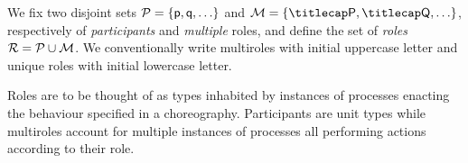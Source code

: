 %

We fix two disjoint sets $\participants = \{\ptp p, \ptp q, \ldots\}$
and $\multiroles = \{\amulti P, \amulti Q, \ldots \}$, respectively of
\emph{participants} and \emph{multiple} roles, and define the set of
\emph{roles} $\mathcal{R} = \mathcal{P} \cup \mathcal{M}$.
%
We conventionally write multiroles with initial uppercase letter and
unique roles with initial lowercase letter.
%

Roles are to be thought of as types inhabited by instances of
processes enacting the behaviour specified in a choreography.
%
Participants are unit types while multiroles account for multiple
instances of processes all performing actions according to their role.

